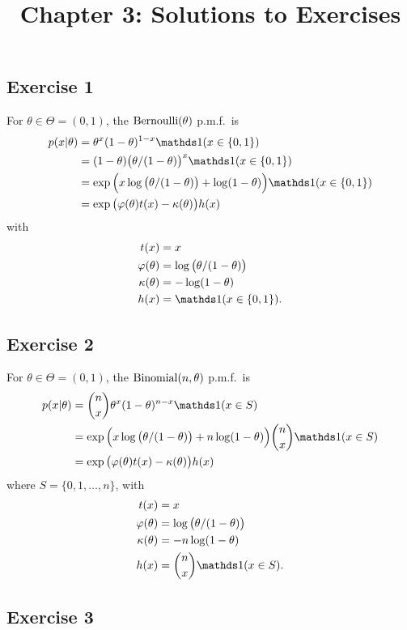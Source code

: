 \documentclass[12pt]{article}
\title{Chapter 3: Solutions to Exercises}
\author{}
\date{}
\begin{document}
\maketitle
\thispagestyle{firststyle}

\subsection*{Exercise 1}

For $\theta\in\Theta =(0,1)$, the $\operatorname*{Bernoulli}(\theta)$ p.m.f.\ is
\begin{align*}
p(x|\theta) & =\theta^x(1-\theta)^{1-x}\I(x\in\{0,1\}) \\
&=(1-\theta)\big(\theta/(1-\theta)\big)^x\I(x\in\{0,1\})\\
& =\exp\Big(x\log\big(\theta/(1-\theta)\big) +\log(1-\theta)\Big)\I(x\in\{0,1\})\\
& =\exp\big(\varphi(\theta) t(x)-\kappa(\theta)\big)h(x)
\end{align*}
with
\begin{align*}
t(x) &= x \\
\varphi(\theta) & =\log\big(\theta/(1-\theta)\big) \\
\kappa(\theta) & = -\log(1-\theta) \\
h(x) &= \I(x\in\{0,1\}).
\end{align*}


\subsection*{Exercise 2}

For $\theta\in\Theta =(0,1)$, the $\operatorname*{Binomial}(n,\theta)$ p.m.f.\ is
\begin{align*}
p(x|\theta) & ={n \choose x}\theta^x(1-\theta)^{n-x}\I(x\in S)\\
& =\exp\Big(x\log\big(\theta/(1-\theta)\big) +n\log(1-\theta)\Big){n\choose x}\I(x\in S)\\
& =\exp\big(\varphi(\theta) t(x)-\kappa(\theta)\big)h(x)
\end{align*}
where $S =\{0,1,\dotsc,n\}$, with
\begin{align*}
t(x) &= x \\
\varphi(\theta) & =\log\big(\theta/(1-\theta)\big) \\
\kappa(\theta) & = -n\log(1-\theta) \\
h(x) &= {n\choose x}\I(x\in S).
\end{align*}


\subsection*{Exercise 3}
\end{document}
